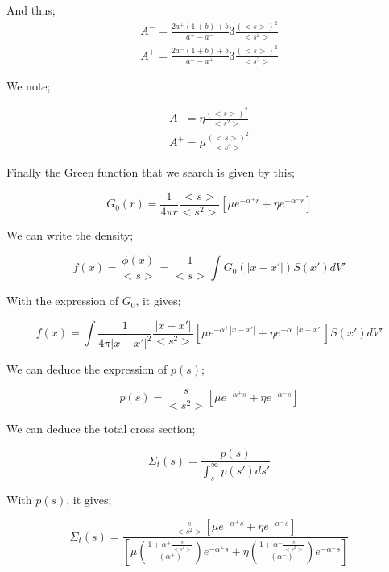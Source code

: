 \documentclass[preprint,12pt]{elsarticle}
\newcommand{\bl}{\big<}
\newcommand{\bg}{\big>}
\begin{document}
And thus;
\begin{align}
A^- = \frac{2a^+(1+b)+b}{a^+-a^-} 3\frac{\left({\bl s \bg}\right)^2}{{{\bl s^2 \bg}}}\\
A^+ = \frac{2a^-(1+b)+b}{a^--a^+} 3\frac{\left({\bl s \bg}\right)^2}{{{\bl s^2 \bg}}}
\end{align}

We note;

\begin{align}
A^- = \eta\frac{\left({\bl s \bg}\right)^2}{{{\bl s^2 \bg}}}\\
A^+ = \mu\frac{\left({\bl s \bg}\right)^2}{{{\bl s^2 \bg}}}
\end{align}

Finally the Green function that we search is given by this;

\begin{equation}
G_0(r) = \frac{1}{4\pi r} \frac{{\bl s \bg}}{{{\bl s^2 \bg}}} \left[\mu e^{-\alpha^+ r} + \eta e^{-\alpha^- r} \right]
\end{equation}

We can write the density;

\begin{equation}
f(x) = \frac{\phi(x)}{{\bl s \bg}} = \frac{1}{{\bl s \bg}} \int G_0(|x-x'|) S(x') dV' 
\end{equation}

With the expression of $G_0$, it gives;

\begin{equation}
f(x) = \int \frac{1}{4\pi |x-x'|^2} \frac{|x-x'|}{{{\bl s^2 \bg}}} \left[\mu e^{-\alpha^+ |x-x'|} + \eta e^{-\alpha^- |x-x'|} \right]  S(x') dV' 
\end{equation}

We can deduce the expression of $p(s)$;

\begin{equation}
p(s) = \frac{s}{{{\bl s^2 \bg}}} \left[\mu e^{-\alpha^+ s} + \eta e^{-\alpha^- s}\right]
\end{equation}


We can deduce the total cross section;

\begin{equation}
\Sigma_t(s) = \frac{p(s)}{\int_s^\infty p(s')ds'}
\end{equation}

With $p(s)$, it gives;

\begin{equation}
\Sigma_t(s) = \frac{\frac{s}{{{\bl s^2 \bg}}} \left[\mu e^{-\alpha^+ s} + \eta e^{-\alpha^- s}\right]}{\left[\mu \left( \frac{1+ \alpha^+\frac{s}{{{\bl s^2 \bg}}}}{\left(\alpha^+\right)}\right)e^{-\alpha^+ s} + \eta \left( \frac{1+ \alpha^-\frac{s}{{{\bl s^2 \bg}}}}{\left(\alpha^-\right)}\right)e^{-\alpha^- s}\right]}
\end{equation}
\end{document}
